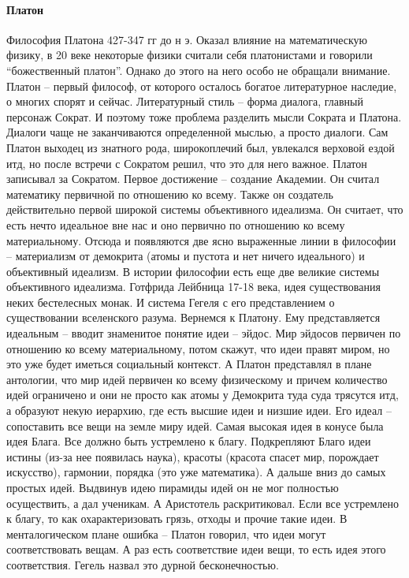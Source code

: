 \documentclass[a4paper, 12pt]{article}
\begin{document}
\paragraph{Платон}Философия Платона 427-347 гг до н э. Оказал влияние на математическую физику, в 20 веке некоторые физики считали себя платонистами и говорили ``божественный платон''. Однако до этого на него особо не обращали внимание. Платон -- первый философ, от которого осталось богатое литературное наследие, о многих спорят и сейчас. Литературный стиль -- форма диалога, главный персонаж Сократ. И поэтому тоже проблема разделить мысли Сократа и Платона. Диалоги чаще не заканчиваются определенной мыслью, а просто диалоги. Сам Платон выходец из знатного рода, широкоплечий был, увлекался верховой ездой итд, но после встречи с Сократом решил, что это для него важное. Платон записывал за Сократом. Первое достижение -- создание Академии. Он считал математику первичной по отношению ко всему. Также он создатель действительно первой широкой системы объективного идеализма. Он считает, что есть нечто идеальное вне нас и оно первично по отношению ко всему материальному. Отсюда и появляются две ясно выраженные линии в философии -- материализм от демокрита (атомы и пустота и нет ничего идеального) и объективный идеализм. В истории философии есть еще две великие системы объективного идеализма. Готфрида Лейбница 17-18 века, идея существования неких бестелесных монак. И система Гегеля с его представлением о существовании вселенского разума. Вернемся к Платону. Ему представляется идеальным -- вводит знаменитое понятие идеи -- эйдос. Мир эйдосов первичен по отношению ко всему материальному, потом скажут, что идеи правят миром, но это уже будет иметься социальный контекст. А Платон представлял в плане антологии, что мир идей первичен ко всему физическому и причем количество идей ограничено и они не просто как атомы у Демокрита туда суда трясутся итд, а образуют некую иерархию, где есть высшие идеи и низшие идеи. Его идеал -- сопоставить все вещи на земле миру идей. Самая высокая идея в конусе была идея Блага. Все должно быть устремлено к благу. Подкрепляют Благо идеи истины (из-за нее появилась наука), красоты (красота спасет мир, порождает искусство), гармонии, порядка (это уже математика). А дальше вниз до самых простых идей. Выдвинув идею пирамиды идей он не мог полностью осуществить, а дал ученикам. А Аристотель раскритиковал. Если все устремлено к благу, то как охарактеризовать грязь, отходы и прочие такие идеи. В менталогическом плане ошибка -- Платон говорил, что идеи могут соответствовать вещам. А раз есть соответствие идеи вещи, то есть идея этого соответствия. Гегель назвал это дурной бесконечностью.
\end{document}
